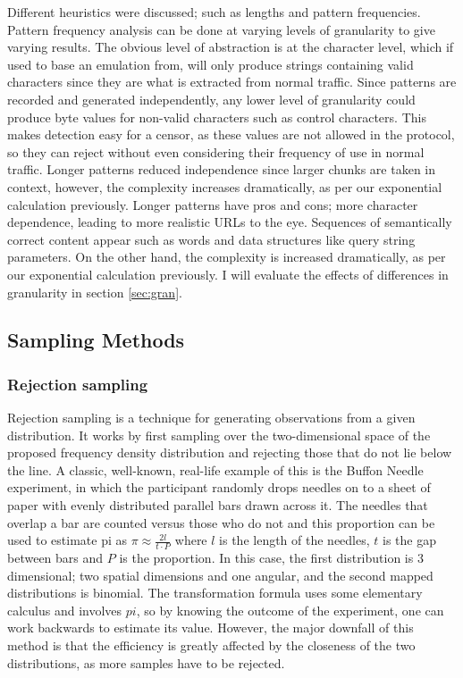 \documentclass[ %
                    author={Samuel Russell},
                supervisor={Prof. Bogdan Warinschi},
                    degree={MEng},
                     title={Innocuous Ciphertexts},
                  subtitle={The DE-CENSOR Scheme},
                      type={Research},
                      year={2018} ]{dissertation}
\begin{document}
Different heuristics were discussed; such as lengths and pattern frequencies.
Pattern frequency analysis can be done at varying levels of granularity to give varying results.
The obvious level of abstraction is at the character level, which if used to base an emulation from, will only produce strings containing valid characters since they are what is extracted from normal traffic.
Since patterns are recorded and generated independently, any lower level of granularity could produce byte values for non-valid characters such as control characters.
This makes detection easy for a censor, as these values are not allowed in the protocol, so they can reject without even considering their frequency of use in normal traffic.
Longer patterns reduced independence since larger chunks are taken in context, however, the complexity increases dramatically, as per our exponential calculation previously.
Longer patterns have pros and cons; more character dependence, leading to more realistic URLs to the eye. Sequences of semantically correct content appear such as words and data structures like query string parameters. On the other hand, the complexity is increased dramatically, as per our exponential calculation previously.
I will evaluate the effects of differences in granularity in section \ref{sec:gran}.


\subsection{Sampling Methods}

\subsubsection{Rejection sampling}

Rejection sampling is a technique for generating observations from a given distribution.
It works by first sampling over the two-dimensional space of the proposed frequency density distribution and rejecting those that do not lie below the line.
A classic, well-known, real-life example of this is the Buffon Needle experiment, in which the participant randomly drops needles on to a sheet of paper with evenly distributed parallel bars drawn across it.
The needles that overlap a bar are counted versus those who do not and this proportion can be used to estimate pi as $\pi \approx \frac{2l}{t \cdot P}$ where $l$ is the length of the needles, $t$ is the gap between bars and $P$ is the proportion.
In this case, the first distribution is 3 dimensional; two spatial dimensions and one angular, and the second mapped distributions is binomial.
The transformation formula uses some elementary calculus and involves $pi$, so by knowing the outcome of the experiment, one can work backwards to estimate its value.
However, the major downfall of this method is that the efficiency is greatly affected by the closeness of the two distributions, as more samples have to be rejected.
\end{document}
